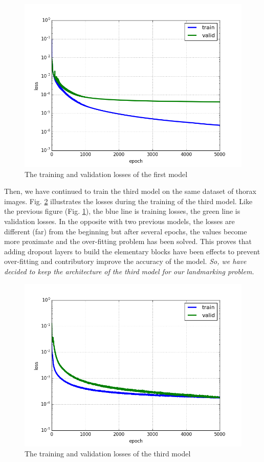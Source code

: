 \begin{figure}[h]
	\centering
	\includegraphics[scale=0.6]{images/cnnmodel3_5000_pronotum_v13_without_dropout_normalized_data_loss}
	\caption{The training and validation losses of the first model}
	\label{figloss1}
\end{figure}

Then, we have continued to train the third model on the same dataset of thorax images. Fig. \ref{figloss2} illustrates the losses during the training of the third model. Like the previous figure (Fig. \ref{figloss1}), the blue line is training losses, the green line is validation losses. In the opposite with two previous models, the losses are different (far) from the beginning but after several epochs, the values become more proximate and the over-fitting problem has been solved. This proves that adding dropout layers to build the elementary blocks have been effects to prevent over-fitting and contributory improve the accuracy of the model. \textit{So, we have decided to keep the architecture of the third model for our landmarking problem.}

\begin{figure}[h]
	\centering
	\includegraphics[scale=0.6]{images/loss_v16}
	\caption{The training and validation losses of the third model}
	\label{figloss2}
\end{figure}

